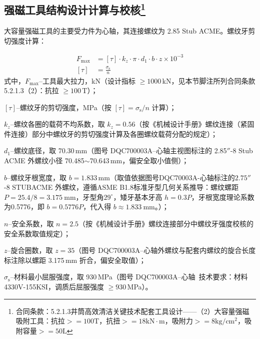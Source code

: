 \subsection[强磁工具结构设计计算与校核]{强磁工具结构设计计算与校核\protect\footnote{合同条款：5.2.1.3井筒高效清洁关键技术配套工具设计——（2）大容量强磁吸附工具：抗拉$>=100\mathrm{T}$，抗扭$>=18 \mathrm{kN}\cdot \mathrm{m}$，吸附力$>=8\mathrm{kg/cm^2}$，吸附容量$>=50\mathrm{L}$}}\label{sec:mag_tool_check}


大容量强磁工具的主要受力件为心轴，其连接螺纹为 2.85 Stub ACME。螺纹牙剪切强度计算：

\begin{equation}
    \begin{aligned}
        F_{\max} &= [\tau] \cdot k_z \cdot \pi \cdot d_1 \cdot b \cdot z \times 10^{-3} \\
        [\tau] &= \frac{\sigma_{\mathrm{s}}}{n}
    \end{aligned}
\end{equation}
式中，$F_{\max}$--工具最大拉力，kN（设计指标 $\ge 1000$\,kN，见本节脚注所列合同条款 5.2.1.3（2）：抗拉 $\ge 100$\,T）；

$[\tau]$--螺纹牙的剪切强度，MPa（按 $[\tau]=\sigma_{\mathrm{s}}/n$ 计算）；

$k_z$--螺纹各圈的载荷不均系数，取 $k_z = 0.56$（按《机械设计手册》螺纹连接（紧固件连接）部分中螺纹牙的剪切强度计算及各圈螺纹载荷分配的规定\cite{ref26}）；

$d_1$--螺纹底径，取 70.30\,mm（图号 DQC700003A--心轴主视图标注的 2.85$''$-8 Stub ACME 外螺纹小径 70.485$\sim$70.643\,mm，偏安全取小值侧）；

$b$--螺纹牙根宽度，取 $b = 1.833\,\text{mm}$（取值依据图号DQC70003A-心轴标注的$2.75''$-8 STUBACME 外螺纹，遵循ASME B1.8标准牙型几何关系推导：螺纹螺距 $P=25.4/8=3.175\ \mathrm{mm}$，牙型角$29^\circ$，矮牙基本牙高 $h=0.3P$，牙根宽度理论系数为0.5776，即 $b=0.5776P$，代入得 $b\approx1.833\ \mathrm{mm}$。）；

$n$--安全系数，取 $n = 2.5$（按《机械设计手册》螺纹连接部分中螺纹牙强度校核的安全系数取值规定\cite{ref26}）；

$z$--旋合圈数，取 $z = 35$（图号 DQC700003A--心轴外螺纹与配套内螺纹的旋合长度标注除以螺距 3.175\,mm 折合，偏安全取值）；

$\sigma_{\mathrm{s}}$--材料最小屈服强度，取 930\,MPa（图号 DQC700003A--心轴\ 技术要求：材料 4330V-155KSI，调质后屈服强度 $\ge 930$\,MPa）。



